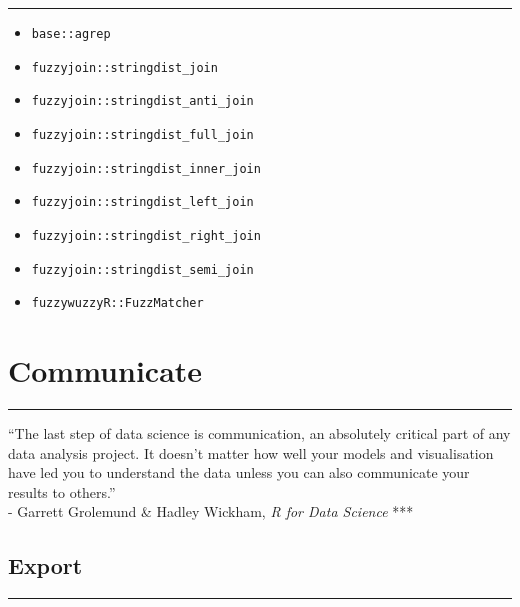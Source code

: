 \documentclass[
]{book}
\providecommand{\tightlist}{%
  \setlength{\itemsep}{0pt}\setlength{\parskip}{0pt}}
\begin{document}
\begin{center}\rule{0.5\linewidth}{0.5pt}\end{center}

\begin{itemize}
\tightlist
\item
  \texttt{base::agrep}
\item
  \texttt{fuzzyjoin::stringdist\_join}
\item
  \texttt{fuzzyjoin::stringdist\_anti\_join}
\item
  \texttt{fuzzyjoin::stringdist\_full\_join}
\item
  \texttt{fuzzyjoin::stringdist\_inner\_join}
\item
  \texttt{fuzzyjoin::stringdist\_left\_join}
\item
  \texttt{fuzzyjoin::stringdist\_right\_join}
\item
  \texttt{fuzzyjoin::stringdist\_semi\_join}
\item
  \texttt{fuzzywuzzyR::FuzzMatcher}
\end{itemize}

\hypertarget{communicate}{%
\chapter{Communicate}\label{communicate}}

\begin{center}\rule{0.5\linewidth}{0.5pt}\end{center}

``The last step of data science is communication, an absolutely critical part of any data analysis project. It doesn't matter how well your models and visualisation have led you to understand the data unless you can also communicate your results to others.''\\
- Garrett Grolemund \& Hadley Wickham, \emph{R for Data Science}
***

\hypertarget{export}{%
\section{Export}\label{export}}

\begin{center}\rule{0.5\linewidth}{0.5pt}\end{center}
\end{document}
